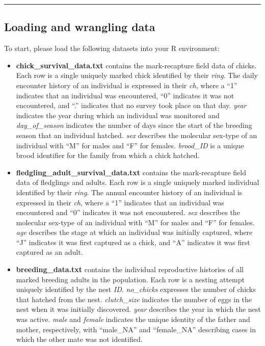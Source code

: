 \documentclass[]{article}
\begin{document}
\begin{center}\rule{0.5\linewidth}{\linethickness}\end{center}

\subsection{Loading and wrangling
data}\label{loading-and-wrangling-data}

To start, please load the following datasets into your R environment:

\begin{itemize}
\item
  \textbf{chick\_survival\_data.txt} contains the mark-recapture field
  data of chicks. Each row is a single uniquely marked chick identified
  by their \emph{ring}. The daily encounter history of an individual is
  expressed in their \emph{ch}, where a ``1'' indicates that an
  individual was encountered, ``0'' indicates it was not encountered,
  and ``.'' indicates that no survey took place on that day. \emph{year}
  indicates the year during which an individual was monitored and
  \emph{day\_of\_season} indicates the number of days since the start of
  the breeding season that an individual hatched. \emph{sex} describes
  the molecular sex-type of an individual with ``M'' for males and ``F''
  for females. \emph{brood\_ID} is a unique brood identifier for the
  family from which a chick hatched.
\item
  \textbf{fledgling\_adult\_survival\_data.txt} contains the
  mark-recapture field data of fledglings and adults. Each row is a
  single uniquely marked individual identified by their \emph{ring}. The
  annual encounter history of an individual is expressed in their
  \emph{ch}, where a ``1'' indicates that an individual was encountered
  and ``0'' indicates it was not encountered. \emph{sex} describes the
  molecular sex-type of an individual with ``M'' for males and ``F'' for
  females. \emph{age} describes the stage at which an individual was
  initially captured, where ``J'' indicates it was first captured as a
  chick, and ``A'' indicates it was first captured as an adult.
\item
  \textbf{breeding\_data.txt} contains the individual reproductive
  histories of all marked breeding adults in the population. Each row is
  a nesting attempt uniquely identified by the nest \emph{ID}.
  \emph{no\_chicks} expresses the number of chicks that hatched from the
  nest. \emph{clutch\_size} indicates the number of eggs in the nest
  when it was initially discovered. \emph{year} describes the year in
  which the nest was active. \emph{male} and \emph{female} indicates the
  unique identity of the father and mother, respectively, with
  ``male\_NA'' and ``female\_NA'' describing cases in which the other
  mate was not identified.
\end{itemize}
\end{document}
